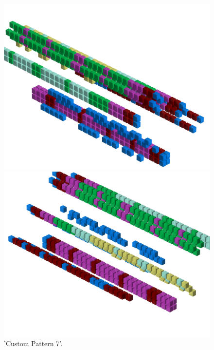 \begin{figure}[H]
    \centering
    \begin{adjustbox}{width=12cm,center}
      \includegraphics[width=12cm]{src/patterns/pattern14-45.png}%
    \end{adjustbox}
    \begin{adjustbox}{width=12cm,margin=0cm -4cm}
      \includegraphics[width=12cm]{src/patterns/pattern14-225.png}%
    \end{adjustbox}
\caption{'Custom Pattern 7'.}
\end{figure}
\clearpage

